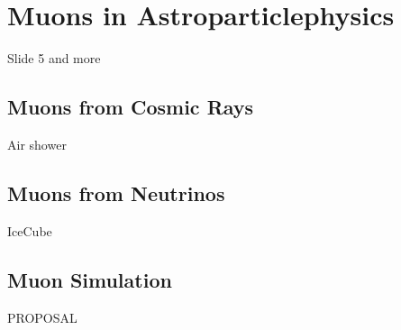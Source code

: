 \chapter{Muons in Astroparticlephysics}
\label{sec:theory}

Slide 5 and more

\section{Muons from Cosmic Rays}

Air shower

\section{Muons from Neutrinos}

IceCube

\section{Muon Simulation}

PROPOSAL \cite{JHK, PROPOSAL, dPROPOSAL}